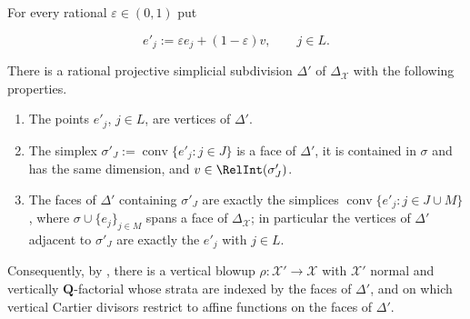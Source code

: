 \begin{lemma}
\label{lem:ch22-star-shrinking}
For every rational $\varepsilon\in(0,1)$ put

\[
                 e'_j:=\varepsilon e_j+(1-\varepsilon)v,
                 \qquad j\in L .
\tag{22.36}\label{eq:ch22-star-shrink}
\]

There is a rational projective simplicial subdivision $\Delta'$ of
$\Delta_{\mathcal X}$ with the following properties.
\begin{enumerate}
\item\label{itm:ch22-star:vertices} The points $e'_j$, $j\in L$, are
vertices of $\Delta'$.
\item\label{itm:ch22-star:face} The simplex
$\sigma'_J:=\operatorname{conv}\{e'_j:j\in J\}$ is a face of $\Delta'$,
it is contained in $\sigma$ and has the same dimension, and
$v\in\RelInt(\sigma'_J)$.
\item\label{itm:ch22-star:star} The faces of $\Delta'$ containing
$\sigma'_J$ are exactly the simplices
$\operatorname{conv}\{e'_j:j\in J\cup M\}$, where $\sigma\cup\{e_j\}_{j\in
M}$ spans a face of $\Delta_{\mathcal X}$; in particular the vertices of
$\Delta'$ adjacent to $\sigma'_J$ are exactly the $e'_j$ with
$j\in L$.
\end{enumerate}
Consequently, by , there is a vertical blowup
$\rho:\mathcal X'\to\mathcal X$ with $\mathcal X'$ normal and vertically
$\mathbf Q$-factorial whose strata are indexed by the faces of
$\Delta'$, and on which vertical Cartier divisors restrict to affine
functions on the faces of $\Delta'$.
\end{lemma}

